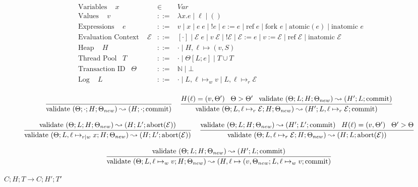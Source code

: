 \documentclass[9pt]{article}
\newcommand{\ctxt}[0]{\mathcal{E}}
\newcommand{\loc}[0]{\ell}
\newcommand{\atomic}[1]{\text{atomic}(#1)}
\newcommand{\alloc}[1]{\text{ref} \; #1}
\newcommand{\commit}[0]{\text{commit}}
\newcommand{\abort}[1]{\text{abort}(#1)}
\newcommand{\fork}[1]{\text{fork } #1}
\newcommand{\inatomic}[1]{\text{inatomic } #1}
\newcommand{\validate}[1]{\text{validate }(#1)}
\begin{document}
\begingroup\makeatletter{}\check@mathfonts


\begin{displaymath}
\begin{array}{rcll}
\text{Variables } \;\;\; x &\in& Var \\
\text{Values } \;\;\; v &::=& \lambda x. e \; | \; \loc \; | \; () \\
\text{Expressions } \;\;\; e &::=& v \; | \; x \; | \; e \; e \; | \; !e \; | \; e := e \; | \; \alloc{e} \; | \; \fork{e} \; | \; \atomic{e} \; | \; \inatomic{e}\\
\text{Evaluation Context } \;\;\; \ctxt &::=& [\cdot] \; | \; \ctxt \; e \; | \; v \; \ctxt \; | \; ! \ctxt \; | \; \ctxt := e \; | \; v := \ctxt \; | \; \alloc{\ctxt} \; | \; \inatomic{\ctxt}\\
\text{Heap } \;\;\; H &::=& \cdot \; | \; H, \loc \mapsto (v, S) \\
\text{Thread Pool} \;\;\; T &::=& \cdot \; | \; \Theta[L; e] \; | \; T \cup T \\
\text{Transaction ID} \;\;\; \Theta &::=& \mathbb{N} \; | \; \bot \\
\text{Log } \;\;\; L &::=& \cdot \; | \; L, \loc \mapsto_w v \; | \; L, \loc \mapsto_r \ctxt \\
\end{array}
\end{displaymath}

\[
\infer[]{\validate{\Theta; \cdot; H; \Theta_{new}} \leadsto (H; \cdot; \commit)}{} \;\;\;
\infer[]{\validate{\Theta; L, \loc \mapsto_r \ctxt; H; \Theta_{new}} \leadsto (H'; L, \loc \mapsto_r \ctxt; \commit)}{H(\loc) = (v, \Theta') \;\;\; \Theta > \Theta' \;\;\; \validate{\Theta; L; H; \Theta_{new}} \leadsto (H'; L; \commit)}
\]

\[
\infer[]{\validate{\Theta; L, \loc \mapsto_{r|w} x; H; \Theta_{new}} \leadsto (H; L'; \abort{\ctxt})}{\validate{\Theta; L; H; \Theta_{new}} \leadsto (H; L'; \abort{\ctxt})} \;\;\;
\infer[]{\validate{\Theta; L, \loc \mapsto_r \ctxt; H; \Theta_{new}} \leadsto (H; L; \abort{\ctxt})}{\validate{\Theta; L; H; \Theta_{new}} \leadsto (H'; L'; \commit) \;\;\; H(\loc) = (v, \Theta') \;\;\; \Theta' > \Theta}
\]

\[
\infer[]{\validate{\Theta; L, \loc \mapsto_w v; H; \Theta_{new}} \leadsto (H, \loc \mapsto (v, \Theta_{new}; L, \loc \mapsto_w v; \commit)}{\validate{\Theta; L; H; \Theta_{new}} \leadsto (H'; L; \commit)}
\]

$\boxed{C; H; T \rightarrow C; H' ;T'}$
\end{document}
